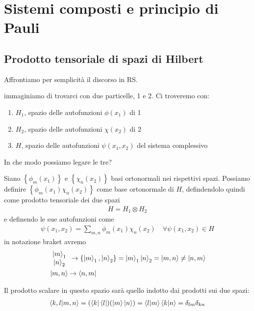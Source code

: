 \chapter{Sistemi composti e principio di Pauli}

\section{Prodotto tensoriale di spazi di Hilbert}

Affrontiamo per semplicità il discorso in RS.

immaginiamo di trovarci con due particelle, 1 e 2. Ci troveremo con:

\begin{enumerate}
	\item $H_1$, spazio delle autofunzioni $\phi(x_1)$ di 1 
	\item $H_2$, spazio delle autofunzioni $\chi(x_2)$ di 2 
	\item $H$, spazio delle autofunzioni $\psi(x_1,x_2)$ del sistema complessivo
\end{enumerate}
 
 In che modo possiamo legare le tre? 
 
 Siano $\left\{ \phi_m(x_1) \right\}$ e $\left\{ \chi_n(x_2) \right\}$ basi ortonormali nei rispettivi spazi. Possiamo definire  $\left\{ \phi_m(x_1) \chi_n(x_2) \right\}$ come base ortonormale di $H$, defindendolo quindi come prodotto tensoriale dei due spazi
 \begin{align}
 H= H_1 \otimes H_2
 \end{align}
 e definendo le sue autofunzioni come
 \begin{align}
 \psi(x_1,x_2) = \sum_{m,n} \phi_m(x_1) \chi_n(x_2) \quad \forall \psi(x_1,x_2)\in H
 \end{align}
in notazione braket avremo
\begin{align}
&\begin{array}{cc}
\ket{m}_1 \\
\ket{n}_2
\end{array}
\rightarrow 
\left\{ \ket{m}_1 , \ket{n}_2 \right\}=\ket{m}_1 \ket{n}_2 =\ket{m,n} \neq \ket{n,m} \\
&\ket{m,n} \rightarrow \bra{n,m}
\end{align}

Il prodotto scalare in questo spazio sarà quello indotto dai prodotti sui due spazi:
\begin{align}
\braket{k,l|m,n}= (\bra{k}\bra{l})(\ket{m}\ket{n})= \braket{l|m}\braket{k|n}= \delta_{lm}\delta_{kn}
\end{align}

